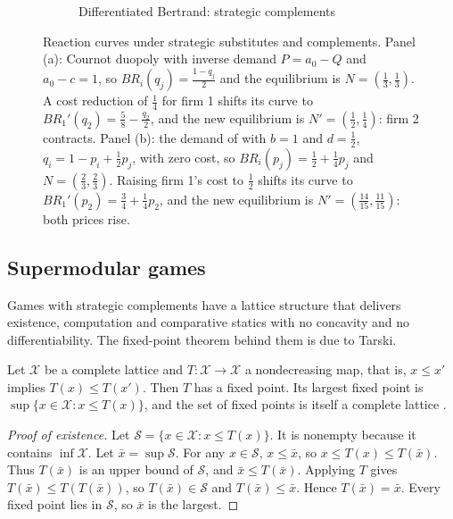\begin{figure}[htbp]
\begin{subfigure}[t]{0.48\textwidth}
\caption{Differentiated Bertrand: strategic complements}
\end{subfigure}
\caption{Reaction curves under strategic substitutes and complements. Panel (a): Cournot duopoly with inverse
demand $P = a_0 - Q$ and $a_0 - c = 1$, so $BR_i(q_j) = \frac{1 - q_j}{2}$ and the equilibrium is
$N = (\frac{1}{3}, \frac{1}{3})$. A cost reduction of $\frac{1}{4}$ for firm 1 shifts its curve to
$BR_1'(q_2) = \frac{5}{8} - \frac{q_2}{2}$, and the new equilibrium is $N' = (\frac{1}{2}, \frac{1}{4})$: firm 2
contracts. Panel (b): the demand of \citet[Section~11.2]{Tirole1988} with $b = 1$ and $d = \frac{1}{2}$,
$q_i = 1 - p_i + \frac{1}{2}p_j$, with zero cost, so
$BR_i(p_j) = \frac{1}{2} + \frac{1}{4}p_j$ and $N = (\frac{2}{3}, \frac{2}{3})$. Raising firm 1's cost to $\frac{1}{2}$ shifts
its curve to $BR_1'(p_2) = \frac{3}{4} + \frac{1}{4}p_2$, and the new equilibrium is
$N' = (\frac{14}{15}, \frac{11}{15})$: both prices rise.}
\label{fig:B-reaction}
\end{figure}

\subsection{Supermodular games}\label{sec:B-supermodular-games}

Games with strategic complements have a lattice structure that delivers existence, computation and comparative
statics with no concavity and no differentiability. The fixed-point theorem behind them is due to Tarski.

\begin{theorem}[Tarski]\label{thm:B-tarski}
Let $\mathcal{X}$ be a complete lattice and $T : \mathcal{X} \to \mathcal{X}$ a nondecreasing map, that is, $x \leq x'$ implies
$T(x) \leq T(x')$. Then $T$ has a fixed point. Its largest fixed point is $\sup\{x \in \mathcal{X} : x \leq T(x)\}$, and the set
of fixed points is itself a complete lattice \citep{Tarski1955}.
\end{theorem}

\begin{proof}[Proof of existence]
Let $\mathcal{S} = \{x \in \mathcal{X} : x \leq T(x)\}$. It is nonempty because it contains $\inf\mathcal{X}$. Let
$\bar x = \sup\mathcal{S}$. For any $x \in \mathcal{S}$, $x \leq \bar x$, so $x \leq T(x) \leq T(\bar x)$. Thus $T(\bar x)$ is an
upper bound of $\mathcal{S}$, and $\bar x \leq T(\bar x)$. Applying $T$ gives $T(\bar x) \leq T(T(\bar x))$, so
$T(\bar x) \in \mathcal{S}$ and $T(\bar x) \leq \bar x$. Hence $T(\bar x) = \bar x$. Every fixed point lies in $\mathcal{S}$,
so $\bar x$ is the largest.
\end{proof}

